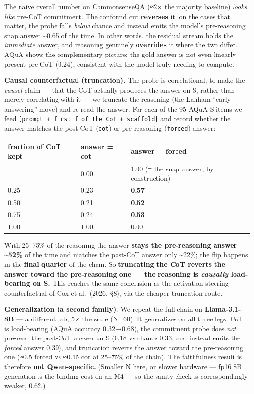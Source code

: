 \documentclass[
]{article}
\begin{document}
The naive overall number on CommonsenseQA (≈2× the majority baseline)
\emph{looks like} pre-CoT commitment. The confound cut \textbf{reverses}
it: on the cases that matter, the probe falls \emph{below} chance and
instead emits the model's pre-reasoning snap answer \textasciitilde0.65
of the time. In other words, the residual stream holds the
\emph{immediate} answer, and reasoning genuinely \textbf{overrides} it
where the two differ. AQuA shows the complementary picture: the gold
answer is not even linearly present pre-CoT (0.24), consistent with the
model truly needing to compute.

\textbf{Causal counterfactual (truncation).} The probe is correlational;
to make the \emph{causal} claim --- that the CoT actually produces the
answer on S, rather than merely correlating with it --- we truncate the
reasoning (the Lanham ``early-answering'' move) and re-read the answer.
For each of the 95 AQuA S items we feed
\texttt{{[}prompt\ +\ first\ f\ of\ the\ CoT\ +\ scaffold{]}} and record
whether the answer matches the post-CoT (\texttt{cot}) or pre-reasoning
(\texttt{forced}) answer:

\begin{longtable}[]{@{}lll@{}}
\toprule\noalign{}
fraction of CoT kept & answer = cot & answer = forced \\
\midrule\noalign{}
\endhead
\bottomrule\noalign{}
\endlastfoot
0.00 & 0.00 & 1.00 (≡ the snap answer, by construction) \\
0.25 & 0.23 & \textbf{0.57} \\
0.50 & 0.21 & \textbf{0.52} \\
0.75 & 0.24 & \textbf{0.53} \\
1.00 & 1.00 & 0.00 \\
\end{longtable}

With 25--75\% of the reasoning the answer \textbf{stays the
pre-reasoning answer \textasciitilde52\%} of the time and matches the
post-CoT answer only \textasciitilde22\%; the flip happens in the
\textbf{final quarter} of the chain. So \textbf{truncating the CoT
reverts the answer toward the pre-reasoning one --- the reasoning is
\emph{causally} load-bearing on S.} This reaches the same conclusion as
the activation-steering counterfactual of Cox et al.~(2026, §8), via the
cheaper truncation route.

\textbf{Generalization (a second family).} We repeat the full chain on
\textbf{Llama-3.1-8B} --- a different lab, 5× the scale (N=60). It
generalizes on all three legs: CoT is load-bearing (AQuA accuracy
0.32→0.68), the commitment probe does \emph{not} pre-read the post-CoT
answer on S (0.18 vs chance 0.33, and instead emits the \emph{forced}
answer 0.39), and truncation reverts the answer toward the pre-reasoning
one (≈0.5 forced vs ≈0.15 cot at 25--75\% of the chain). The
faithfulness result is therefore \textbf{not Qwen-specific.} (Smaller N
here, on slower hardware --- fp16 8B generation is the binding cost on
an M4 --- so the sanity check is correspondingly weaker, 0.62.)
\end{document}
